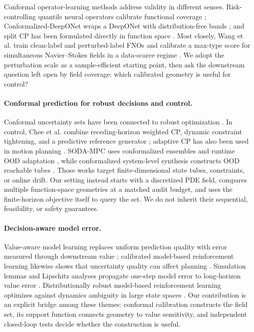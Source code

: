\documentclass[10pt]{article}
\begin{document}
Conformal operator-learning methods address validity in different senses.
Risk-controlling quantile neural operators calibrate functional coverage
\cite{ma2024calibrated}; Conformalized-DeepONet wraps a DeepONet with
distribution-free bands \cite{moya2025conformalized}; and split CP has been
formulated directly in function space \cite{millard2025functionspace}. Most
closely, Wang et al. train clean-label and perturbed-label FNOs and calibrate a
max-type score for simultaneous Navier--Stokes fields in a data-scarce regime
\cite{wang2026perturbation}. We adopt the perturbation scale as a sample-efficient
starting point, then ask the downstream question left open by field coverage:
which calibrated geometry is useful for control?

\paragraph{Conformal prediction for robust decisions and control.}
Conformal uncertainty sets have been connected to robust optimization
\cite{johnstone2021conformal}. In control, Chee et al. combine receding-horizon
weighted CP, dynamic constraint tightening, and a predictive reference
generator \cite{chee2024conformal}; adaptive CP has also been used in motion
planning \cite{dixit2023adaptive}. SODA-MPC uses conformalized ensembles and
runtime OOD adaptation \cite{contreras2025soda}, while conformalized
system-level synthesis constructs OOD reachable tubes
\cite{srinivasan2026ood}. Those works target finite-dimensional state tubes,
constraints, or online drift. Our setting instead starts with a discretized
PDE field, compares multiple function-space geometries at a matched audit
budget, and uses the finite-horizon objective itself to query the set. We do
not inherit their sequential, feasibility, or safety guarantees.

\paragraph{Decision-aware model error.}
Value-aware model learning replaces uniform prediction quality with error
measured through downstream value \cite{farahmand2017value}; calibrated
model-based reinforcement learning likewise shows that uncertainty quality can
affect planning \cite{malik2019calibrated}. Simulation lemmas and Lipschitz
analyses propagate one-step model error to long-horizon value error
\cite{asadi2018lipschitz}. Distributionally robust model-based reinforcement
learning optimizes against dynamics ambiguity in large state spaces
\cite{ramesh2024drmbrl}. Our contribution is an explicit bridge among these
themes: conformal calibration constructs the field set, its support function
connects geometry to value sensitivity, and independent closed-loop tests
decide whether the construction is useful.
\end{document}
